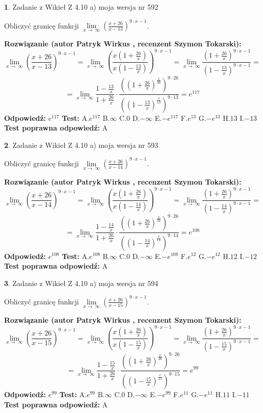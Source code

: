 \documentclass[12pt, a4paper]{article}
\theoremstyle{definition} %
\newtheorem{zad}{}
\newcommand{\zadStart}[1]{\begin{zad}#1\newline}
\newcommand{\zadStop}{\end{zad}}
\newcommand{\rozwStart}[2]{\noindent \textbf{Rozwiązanie (autor #1 , recenzent #2): }\newline}
\newcommand{\rozwStop}{\newline}
\newcommand{\odpStart}{\noindent \textbf{Odpowiedź:}\newline}
\newcommand{\odpStop}{\newline}
\newcommand{\testStart}{\noindent \textbf{Test:}\newline}
\newcommand{\testStop}{\newline}
\newcommand{\kluczStart}{\noindent \textbf{Test poprawna odpowiedź:}\newline}
\newcommand{\kluczStop}{\newline}
\begin{document}
\zadStart{Zadanie z Wikieł Z 4.10 a) moja wersja nr 592}

Obliczyć granicę funkcji  $\lim\limits_{x\to\ \infty}(\frac{x+26}{x-13})^{9\cdot x-1}$.
\zadStop
\rozwStart{Patryk Wirkus}{Szymon Tokarski}
$$\lim\limits_{x\to\ \infty}(\frac{x+26}{x-13})^{9\cdot x-1} = \lim\limits_{x\to\ \infty}(\frac{x(1+\frac{26}{x})}{x(1-\frac{13}{x})})^{9\cdot x-1}=\lim\limits_{x\to\ \infty}\frac{(1+\frac{26}{x})^{9\cdot x-1}}{(1-\frac{13}{x})^{9\cdot x-1}}=$$
$$=\lim\limits_{x\to\ \infty}\frac{1-\frac{13}{x}}{1+\frac{26}{x}}\cdot\frac{((1+\frac{26}{x})^{\frac{x}{26}})^{9\cdot26}}{((1-\frac{13}{x})^{\frac{x}{13}})^{9\cdot13}}=e^{117}$$
\rozwStop
\odpStart
$e^{117}$
\odpStop
\testStart
A.$e^{117}$ B.$\infty$ C.$0$ D.$-\infty$ E.$-e^{117}$
F.$e^{13}$ G.$-e^{13}$
H.$13$
I.$-13$
\testStop
\kluczStart
A
\kluczStop



\zadStart{Zadanie z Wikieł Z 4.10 a) moja wersja nr 593}

Obliczyć granicę funkcji  $\lim\limits_{x\to\ \infty}(\frac{x+26}{x-14})^{9\cdot x-1}$.
\zadStop
\rozwStart{Patryk Wirkus}{Szymon Tokarski}
$$\lim\limits_{x\to\ \infty}(\frac{x+26}{x-14})^{9\cdot x-1} = \lim\limits_{x\to\ \infty}(\frac{x(1+\frac{26}{x})}{x(1-\frac{14}{x})})^{9\cdot x-1}=\lim\limits_{x\to\ \infty}\frac{(1+\frac{26}{x})^{9\cdot x-1}}{(1-\frac{14}{x})^{9\cdot x-1}}=$$
$$=\lim\limits_{x\to\ \infty}\frac{1-\frac{14}{x}}{1+\frac{26}{x}}\cdot\frac{((1+\frac{26}{x})^{\frac{x}{26}})^{9\cdot26}}{((1-\frac{14}{x})^{\frac{x}{14}})^{9\cdot14}}=e^{108}$$
\rozwStop
\odpStart
$e^{108}$
\odpStop
\testStart
A.$e^{108}$ B.$\infty$ C.$0$ D.$-\infty$ E.$-e^{108}$
F.$e^{12}$ G.$-e^{12}$
H.$12$
I.$-12$
\testStop
\kluczStart
A
\kluczStop



\zadStart{Zadanie z Wikieł Z 4.10 a) moja wersja nr 594}

Obliczyć granicę funkcji  $\lim\limits_{x\to\ \infty}(\frac{x+26}{x-15})^{9\cdot x-1}$.
\zadStop
\rozwStart{Patryk Wirkus}{Szymon Tokarski}
$$\lim\limits_{x\to\ \infty}(\frac{x+26}{x-15})^{9\cdot x-1} = \lim\limits_{x\to\ \infty}(\frac{x(1+\frac{26}{x})}{x(1-\frac{15}{x})})^{9\cdot x-1}=\lim\limits_{x\to\ \infty}\frac{(1+\frac{26}{x})^{9\cdot x-1}}{(1-\frac{15}{x})^{9\cdot x-1}}=$$
$$=\lim\limits_{x\to\ \infty}\frac{1-\frac{15}{x}}{1+\frac{26}{x}}\cdot\frac{((1+\frac{26}{x})^{\frac{x}{26}})^{9\cdot26}}{((1-\frac{15}{x})^{\frac{x}{15}})^{9\cdot15}}=e^{99}$$
\rozwStop
\odpStart
$e^{99}$
\odpStop
\testStart
A.$e^{99}$ B.$\infty$ C.$0$ D.$-\infty$ E.$-e^{99}$
F.$e^{11}$ G.$-e^{11}$
H.$11$
I.$-11$
\testStop
\kluczStart
A
\kluczStop
\end{document}
